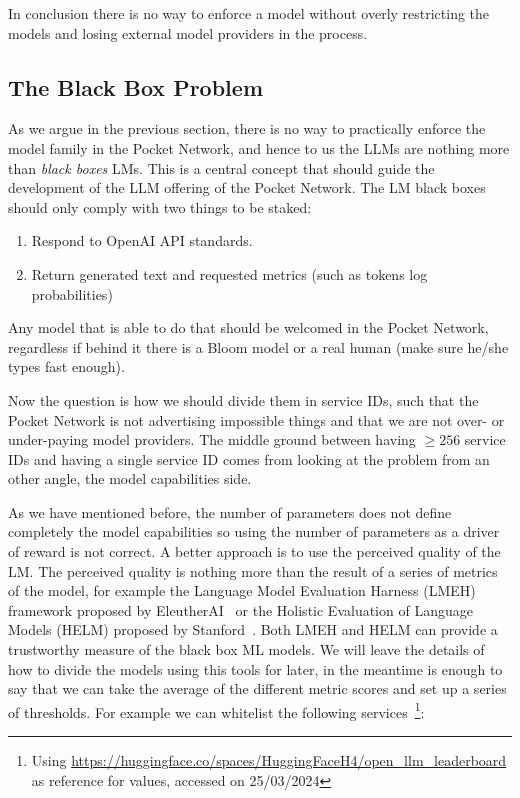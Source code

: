 In conclusion there is no way to enforce a model without overly restricting the models and losing external model providers in the process.

\newpage
\subsection{The Black Box Problem}
As we argue in the previous section, there is no way to practically enforce the model family in the Pocket Network, and hence to us the LLMs are nothing more than \emph{black boxes} LMs. This is a central concept that should guide the development of the LLM offering of the Pocket Network.
The LM black boxes should only comply with two things to be staked:
\begin{enumerate}
    \item Respond to OpenAI API standards.
    \item Return generated text and requested metrics (such as tokens log probabilities)
\end{enumerate}
Any model that is able to do that should be welcomed in the Pocket Network, regardless if behind it there is a Bloom model or a real human (make sure he/she types fast enough).

Now the question is how we should divide them in service IDs, such that the Pocket Network is not advertising impossible things and that we are not over- or under-paying model providers. The middle ground between having $\ge 256$ service IDs and having a single service ID comes from looking at the problem from an other angle, the model capabilities side.

As we have mentioned before, the number of parameters does not define completely the model capabilities so using the number of parameters as a driver of reward is not correct. A better approach is to use the perceived quality of the LM. The perceived quality is nothing more than the result of a series of metrics of the model, for example the Language Model Evaluation Harness (LMEH) framework proposed by EleutherAI~\cite{eval-harness} or the Holistic Evaluation of Language Models (HELM) proposed by Stanford~\cite{liang_holistic_2023}. Both LMEH and HELM can provide a trustworthy measure of the black box ML models. We will leave the details of how to divide the models using this tools for later, in the meantime is enough to say that we can take the average of the different metric scores and set up a series of thresholds. For example we can whitelist the following services~\footnote{Using \url{https://huggingface.co/spaces/HuggingFaceH4/open_llm_leaderboard} as reference for values, accessed on 25/03/2024}:

